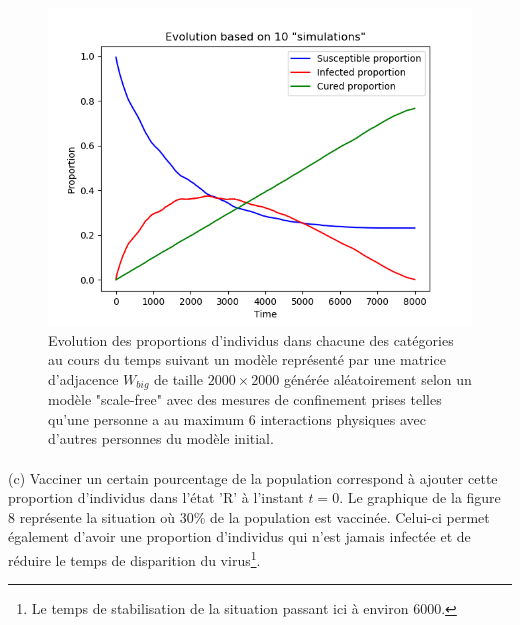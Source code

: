 \documentclass[a4paper, 12pt, oneside]{article}
\begin{document}
\begin{figure}[H]
	\centering
	\includegraphics[scale=1]{Wbig_dense_containment.png} 
	\caption{Evolution des proportions d'individus dans chacune des catégories au cours du temps suivant un modèle représenté par une matrice d'adjacence $W_{big}$ de taille $2000 \times 2000$ générée aléatoirement selon un modèle "scale-free" avec des mesures de confinement prises telles qu'une personne a au maximum 6 interactions physiques avec d'autres personnes du modèle initial.}
\end{figure}

\paragraph{}(c) Vacciner un certain pourcentage de la population correspond à ajouter cette proportion d'individus dans l'état 'R' à l'instant $t = 0$. Le graphique de la figure 8 représente la situation où 30\% de la population est vaccinée. Celui-ci permet également d'avoir une proportion d'individus qui n'est jamais infectée et de réduire le temps de disparition du virus\footnote{Le temps de stabilisation de la situation passant ici à environ 6000.}.
\end{document}
